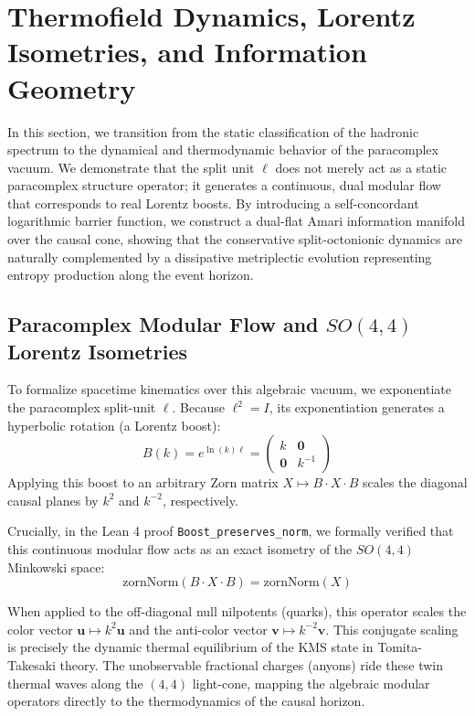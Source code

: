 \documentclass[11pt,a4paper]{article}
\begin{document}
\section{Thermofield Dynamics, Lorentz Isometries, and Information Geometry}

In this section, we transition from the static classification of the hadronic spectrum to the dynamical and thermodynamic behavior of the paracomplex vacuum. We demonstrate that the split unit $\ell$ does not merely act as a static paracomplex structure operator; it generates a continuous, dual modular flow that corresponds to real Lorentz boosts. By introducing a self-concordant logarithmic barrier function, we construct a dual-flat Amari information manifold over the causal cone, showing that the conservative split-octonionic dynamics are naturally complemented by a dissipative metriplectic evolution representing entropy production along the event horizon.

\subsection{Paracomplex Modular Flow and $SO(4,4)$ Lorentz Isometries}

To formalize spacetime kinematics over this algebraic vacuum, we exponentiate the paracomplex split-unit $\ell$. Because $\ell^2 = I$, its exponentiation generates a hyperbolic rotation (a Lorentz boost):
\begin{equation}
B(k) = e^{\ln(k)\ell} = \begin{pmatrix} k & \mathbf{0} \\ \mathbf{0} & k^{-1} \end{pmatrix}
\end{equation}
Applying this boost to an arbitrary Zorn matrix $X \mapsto B \cdot X \cdot B$ scales the diagonal causal planes by $k^2$ and $k^{-2}$, respectively. 

Crucially, in the Lean 4 proof \texttt{Boost\_preserves\_norm}, we formally verified that this continuous modular flow acts as an exact isometry of the $SO(4,4)$ Minkowski space:
\begin{equation}
\text{zornNorm}(B \cdot X \cdot B) = \text{zornNorm}(X)
\end{equation}

When applied to the off-diagonal null nilpotents (quarks), this operator scales the color vector $\mathbf{u} \mapsto k^2 \mathbf{u}$ and the anti-color vector $\mathbf{v} \mapsto k^{-2} \mathbf{v}$. This conjugate scaling is precisely the dynamic thermal equilibrium of the KMS state in Tomita-Takesaki theory. The unobservable fractional charges (anyons) ride these twin thermal waves along the $(4,4)$ light-cone, mapping the algebraic modular operators directly to the thermodynamics of the causal horizon.
\end{document}
